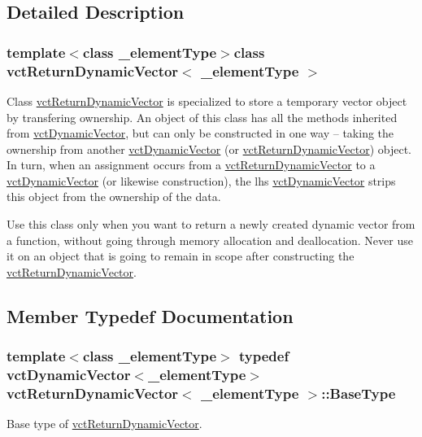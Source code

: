 \subsection{Detailed Description}
\subsubsection*{template$<$class \+\_\+element\+Type$>$class vct\+Return\+Dynamic\+Vector$<$ \+\_\+element\+Type $>$}

Class \hyperlink{classvct_return_dynamic_vector}{vct\+Return\+Dynamic\+Vector} is specialized to store a temporary vector object by transfering ownership. An object of this class has all the methods inherited from \hyperlink{classvct_dynamic_vector}{vct\+Dynamic\+Vector}, but can only be constructed in one way -- taking the ownership from another \hyperlink{classvct_dynamic_vector}{vct\+Dynamic\+Vector} (or \hyperlink{classvct_return_dynamic_vector}{vct\+Return\+Dynamic\+Vector}) object. In turn, when an assignment occurs from a \hyperlink{classvct_return_dynamic_vector}{vct\+Return\+Dynamic\+Vector} to a \hyperlink{classvct_dynamic_vector}{vct\+Dynamic\+Vector} (or likewise construction), the lhs \hyperlink{classvct_dynamic_vector}{vct\+Dynamic\+Vector} strips this object from the ownership of the data.

Use this class only when you want to return a newly created dynamic vector from a function, without going through memory allocation and deallocation. Never use it on an object that is going to remain in scope after constructing the \hyperlink{classvct_return_dynamic_vector}{vct\+Return\+Dynamic\+Vector}. 

\subsection{Member Typedef Documentation}
\hypertarget{classvct_return_dynamic_vector_aec5f994308da32f15af397a1f89ca23d}{}
\subsubsection[{Base\+Type}]{\setlength{\rightskip}{0pt plus 5cm}template$<$class \+\_\+element\+Type$>$ typedef {\bf vct\+Dynamic\+Vector}$<$\+\_\+element\+Type$>$ {\bf vct\+Return\+Dynamic\+Vector}$<$ \+\_\+element\+Type $>$\+::{\bf Base\+Type}}\label{classvct_return_dynamic_vector_aec5f994308da32f15af397a1f89ca23d}
Base type of \hyperlink{classvct_return_dynamic_vector}{vct\+Return\+Dynamic\+Vector}. 

